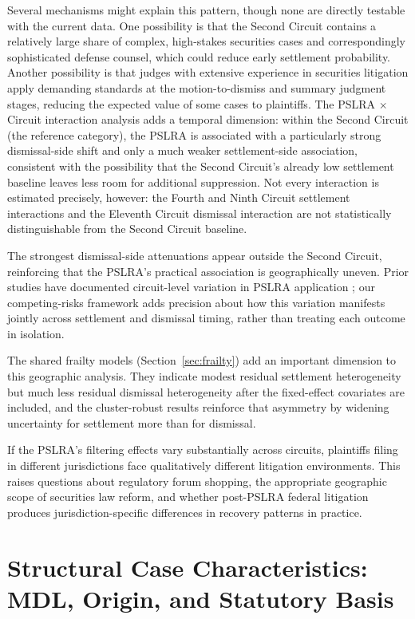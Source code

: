 Several mechanisms might explain this pattern, though none are directly
testable with the current data. One possibility is that the Second Circuit
contains a relatively large share of complex, high-stakes securities cases
and correspondingly sophisticated defense counsel, which could reduce early
settlement probability. Another possibility is that judges with extensive
experience in securities litigation apply demanding standards at the
motion-to-dismiss and summary judgment stages, reducing the expected value
of some cases to plaintiffs. The PSLRA $\times$ Circuit interaction
analysis adds a temporal dimension: within the Second Circuit (the
reference category), the PSLRA is associated with a particularly strong
dismissal-side shift and only a much weaker settlement-side association,
consistent with the possibility that the Second Circuit's already low
settlement baseline leaves less room for additional suppression. Not every
interaction is estimated precisely, however: the Fourth and Ninth Circuit
settlement interactions and the Eleventh Circuit dismissal interaction are
not statistically distinguishable from the Second Circuit baseline.

The strongest dismissal-side attenuations appear outside the
Second Circuit, reinforcing that the PSLRA's practical
association is geographically uneven. Prior studies have
documented circuit-level variation in PSLRA application
\citep{perino2003, choi2007}; our competing-risks framework adds precision about how this
variation manifests jointly across settlement and dismissal
timing, rather than treating each outcome in isolation.

The shared frailty models (Section~\ref{sec:frailty}) add an
important dimension to this geographic analysis. They indicate
modest residual settlement heterogeneity but much less
residual dismissal heterogeneity after the fixed-effect
covariates are included, and the cluster-robust results
reinforce that asymmetry by widening uncertainty for
settlement more than for dismissal.

If the PSLRA's filtering effects vary substantially across
circuits, plaintiffs filing in different jurisdictions face
qualitatively different litigation environments. This raises
questions about regulatory forum shopping, the appropriate
geographic scope of securities law reform, and whether
post-PSLRA federal litigation produces jurisdiction-specific
differences in recovery patterns in practice.

\section{Structural Case Characteristics: MDL, Origin,
and Statutory Basis}

